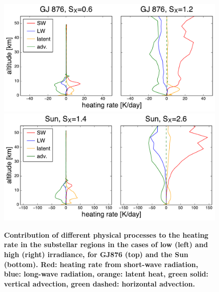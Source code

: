 \documentclass[11pt,numberedappendix,twocolappendix,]{emulateapj}
\def\revise#1{{\bf #1}}
\begin{document}
\begin{figure}[tb]
    \begin{center}
\includegraphics[width=\hsize]{GJ876_heating_rate.pdf}
\includegraphics[width=\hsize]{Sun_heating_rate.pdf}
    \end{center}
    \caption{\revise{\revise{Contribution of different physical processes to the heating rate} in the substellar regions in the cases of low (left) and high (right) irradiance, for GJ876 (top) and the Sun (bottom). Red: heating rate from short-wave radiation, blue: long-wave radiation, orange: latent heat, green solid: vertical advection, green dashed: horizontal advection.}}
\label{fig:heating_rate}
\end{figure}
\end{document}
